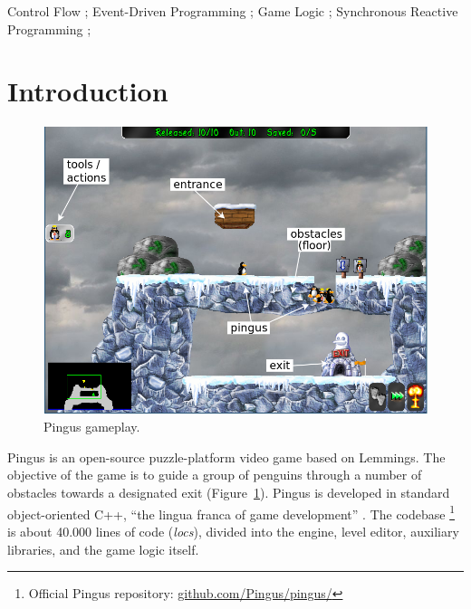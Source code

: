 \documentclass[10pt, conference, compsocconf]{IEEEtran}
\newcommand{\CEU}{\textsc{C\'{e}u}\xspace}
\newcommand{\locs}{\emph{locs}\xspace}
\begin{document}
\begin{IEEEkeywords}
Control Flow                     ;
Event-Driven Programming         ;
Game Logic                       ;
Synchronous Reactive Programming ;
\end{IEEEkeywords}



\section{Introduction}

\begin{figure}
\centering
\includegraphics[width=\columnwidth]{pingus-annotations}
\caption{Pingus gameplay.
\label{fig.pingus}
}
\end{figure}

Pingus is an open-source puzzle-platform video game based on Lemmings.
The objective of the game is to guide a group of penguins through a number of
obstacles towards a designated exit (Figure~\ref{fig.pingus}).
%
Pingus is developed in standard object-oriented C++, ``the lingua franca of
game development'' \cite{games.patterns}.
The codebase%
\footnote{Official Pingus repository: \url{github.com/Pingus/pingus/}}
is about 40.000 lines of code (\locs), divided into
the engine, level editor, auxiliary libraries, and the game logic itself.
\end{document}
